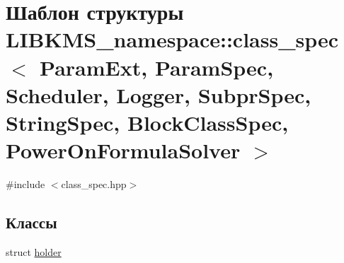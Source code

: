 \hypertarget{structLIBKMS__namespace_1_1class__spec}{\section{Шаблон структуры L\-I\-B\-K\-M\-S\-\_\-namespace\-:\-:class\-\_\-spec$<$ Param\-Ext, Param\-Spec, Scheduler, Logger, Subpr\-Spec, String\-Spec, Block\-Class\-Spec, Power\-On\-Formula\-Solver $>$}
\label{structLIBKMS__namespace_1_1class__spec}
}


{\ttfamily \#include $<$class\-\_\-spec.\-hpp$>$}

\subsection*{Классы}
\begin{DoxyCompactItemize}
\item 
struct \hyperlink{structLIBKMS__namespace_1_1class__spec_1_1holder}{holder}
\end{DoxyCompactItemize}

